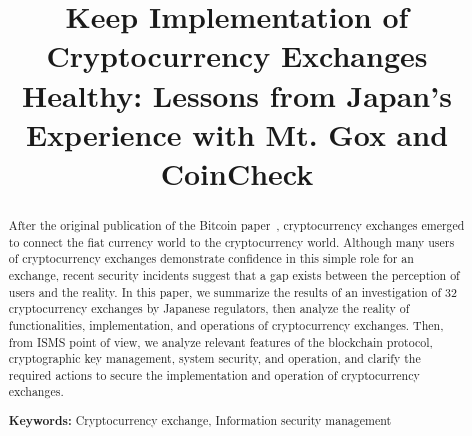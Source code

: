 \documentclass[english]{llncs}
\title{Keep Implementation of Cryptocurrency Exchanges Healthy: Lessons from Japan's Experience with Mt. Gox and CoinCheck}
\begin{document}
\maketitle

\begin{abstract}
After the original publication of the Bitcoin paper~\cite{N08}, cryptocurrency exchanges emerged to connect the fiat currency world to the cryptocurrency world.
Although many users of cryptocurrency exchanges demonstrate confidence in this simple role for an exchange, recent security incidents suggest that a gap
exists
between the perception of users and the reality.
In this paper, we summarize the results of an investigation of
32 cryptocurrency exchanges by Japanese regulators, then analyze the reality of functionalities, implementation, and operations of
cryptocurrency exchanges. Then,
from
ISMS
point of view, we analyze relevant features of the blockchain protocol, cryptographic key management, system security, and operation, and clarify the required actions to secure the implementation and operation of cryptocurrency exchanges.


{\bf Keywords:} Cryptocurrency exchange, Information security management
\end{abstract}

%
%




\end{document}
